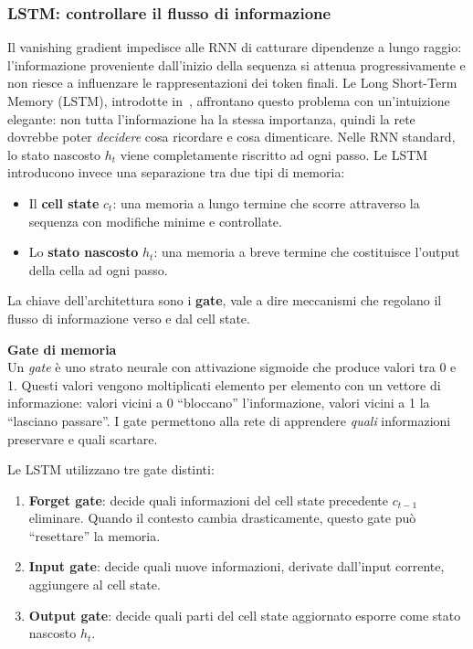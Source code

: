 \subsubsection{LSTM: controllare il flusso di informazione}
\label{subsubsec:lstm}
Il vanishing gradient impedisce alle RNN di catturare dipendenze a lungo raggio: l'informazione proveniente dall'inizio della sequenza si attenua progressivamente e non riesce a influenzare le rappresentazioni dei token finali. Le Long Short-Term Memory (LSTM), introdotte in~\parencite{hochreiter1997long}, affrontano questo problema con un'intuizione elegante: non tutta l'informazione ha la stessa importanza, quindi la rete dovrebbe poter \textit{decidere} cosa ricordare e cosa dimenticare.
Nelle RNN standard, lo stato nascosto $h_t$ viene completamente riscritto ad ogni passo. Le LSTM introducono invece una separazione tra due tipi di memoria:
\begin{itemize}
    \item Il \textbf{cell state} $c_t$: una memoria a lungo termine che scorre attraverso la sequenza con modifiche minime e controllate.
    \item Lo \textbf{stato nascosto} $h_t$: una memoria a breve termine che costituisce l'output della cella ad ogni passo.
\end{itemize}
La chiave dell'architettura sono i \textbf{gate}, vale a dire meccanismi che regolano il flusso di informazione verso e dal cell state.
\begin{notebox}
\textbf{Gate di memoria}\\
Un \textit{gate} è uno strato neurale con attivazione sigmoide che produce valori tra 0 e 1. Questi valori vengono moltiplicati elemento per elemento con un vettore di informazione: valori vicini a 0 ``bloccano'' l'informazione, valori vicini a 1 la ``lasciano passare''. I gate permettono alla rete di apprendere \textit{quali} informazioni preservare e quali scartare.
\end{notebox}
Le LSTM utilizzano tre gate distinti:
\begin{enumerate}
    \item \textbf{Forget gate}: decide quali informazioni del cell state precedente $c_{t-1}$ eliminare. Quando il contesto cambia drasticamente, questo gate può ``resettare'' la memoria.
    \item \textbf{Input gate}: decide quali nuove informazioni, derivate dall'input corrente, aggiungere al cell state.
    \item \textbf{Output gate}: decide quali parti del cell state aggiornato esporre come stato nascosto $h_t$.
\end{enumerate}

